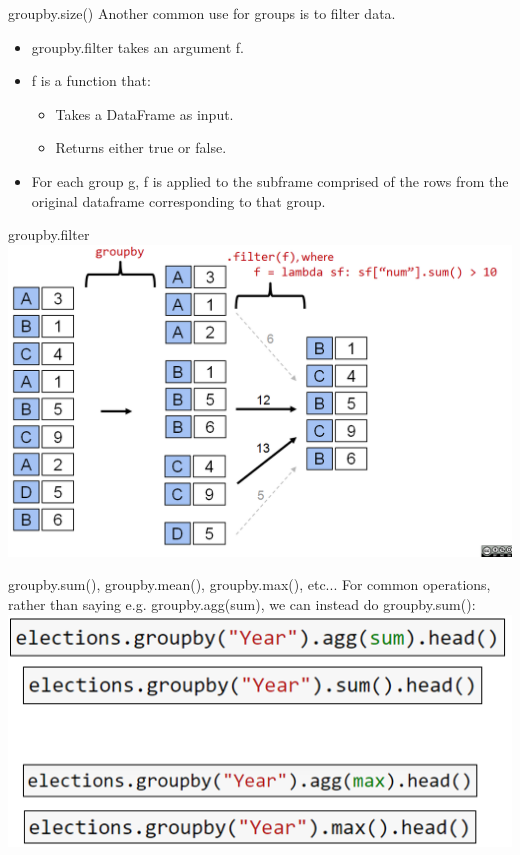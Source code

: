 \documentclass[aspectratio=169]{../latex_main/tntbeamer}  %
\begin{document}
    
    \begin{frame}{groupby.size()}
        Another common use for groups is to filter data.
        \begin{itemize}
            \item groupby.filter takes an argument f.
            \item f is a function that:
            \begin{itemize}
                \item Takes a DataFrame as input.
                \item Returns either true or false.
            \end{itemize}
            \item For each group g, f is applied to the subframe comprised of the rows from the original dataframe corresponding to that group.
        \end{itemize}
    \end{frame}
    
    
    
     \begin{frame}{groupby.filter}
       \centering
       \includegraphics[scale=.36]{Bild35}
    \end{frame}
    
    
    
    
    \begin{frame}{groupby.sum(), groupby.mean(), groupby.max(), etc...}
       For common operations, rather than saying e.g. groupby.agg(sum), we can instead do groupby.sum():\\
        \centering
       \includegraphics[scale=.36]{Bild36}
    \end{frame}
    
\end{document}

